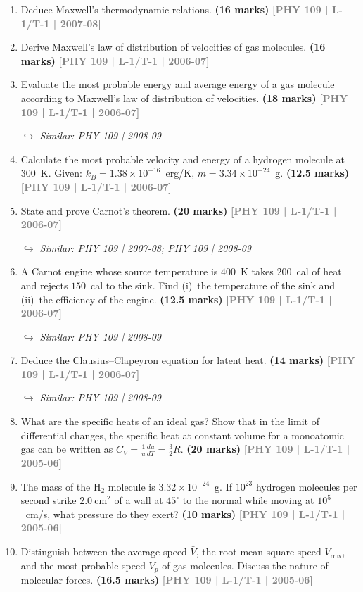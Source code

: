 \documentclass[12pt,a3paper]{article}
\newcommand{\yr}[1]{\hfill\textcolor{gray}{\small\textbf{[#1]}}}
\newcommand{\mk}[1]{\textcolor{orange!70!black}{\small\textbf{(#1 marks)}}}
\newcommand{\variant}[1]{\par\vspace{1pt}\textcolor{blue!50!black}%
  {\footnotesize\textit{$\hookrightarrow$ Similar: #1}}}
\begin{document}
\begin{enumerate}
\item Deduce Maxwell's thermodynamic relations.
\mk{16} \yr{PHY 109 | L-1/T-1 | 2007-08}

\item Derive Maxwell's law of distribution of velocities of gas molecules.
\mk{16} \yr{PHY 109 | L-1/T-1 | 2006-07}

\item Evaluate the most probable energy and average energy of a gas molecule according to Maxwell's law of distribution of velocities.
\mk{18} \yr{PHY 109 | L-1/T-1 | 2006-07}
\variant{PHY 109 | 2008-09}

\item Calculate the most probable velocity and energy of a hydrogen molecule at $300$~K. Given: $k_B = 1.38\times10^{-16}$~erg/K, $m = 3.34\times10^{-24}$~g.
\mk{12.5} \yr{PHY 109 | L-1/T-1 | 2006-07}

\item State and prove Carnot's theorem.
\mk{20} \yr{PHY 109 | L-1/T-1 | 2006-07}
\variant{PHY 109 | 2007-08; PHY 109 | 2008-09}

\item A Carnot engine whose source temperature is $400$~K takes $200$~cal of heat and rejects $150$~cal to the sink. Find (i)~the temperature of the sink and (ii)~the efficiency of the engine.
\mk{12.5} \yr{PHY 109 | L-1/T-1 | 2006-07}
\variant{PHY 109 | 2008-09}

\item Deduce the Clausius--Clapeyron equation for latent heat.
\mk{14} \yr{PHY 109 | L-1/T-1 | 2006-07}
\variant{PHY 109 | 2008-09}

\item What are the specific heats of an ideal gas? Show that in the limit of differential changes, the specific heat at constant volume for a monoatomic gas can be written as $C_V = \frac{1}{u}\frac{du}{dT} = \frac{3}{2}R$.
\mk{20} \yr{PHY 109 | L-1/T-1 | 2005-06}

\item The mass of the H$_2$ molecule is $3.32\times10^{-24}$~g. If $10^{23}$ hydrogen molecules per second strike $2.0\ \text{cm}^2$ of a wall at $45^\circ$ to the normal while moving at $10^5$~cm/s, what pressure do they exert?
\mk{10} \yr{PHY 109 | L-1/T-1 | 2005-06}

\item Distinguish between the average speed $\bar{V}$, the root-mean-square speed $V_\text{rms}$, and the most probable speed $V_p$ of gas molecules. Discuss the nature of molecular forces.
\mk{16.5} \yr{PHY 109 | L-1/T-1 | 2005-06}


\end{enumerate}
\end{document}
